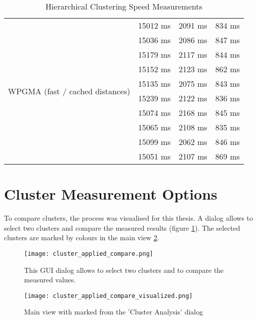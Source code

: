 \begin{table}[!ht]
\begin{tabular}{ | l | l | l | l | }
        \multirow{10}{*}{\begin{minipage}{3cm}WPGMA (fast / cached distances)\end{minipage}}
        & 15012 ms & 2091 ms & 834 ms \\
        & 15036 ms & 2086 ms & 847 ms \\
        & 15179 ms & 2117 ms & 844 ms \\
        & 15152 ms & 2123 ms & 862 ms \\
        & 15135 ms & 2075 ms & 843 ms \\
        & 15239 ms & 2122 ms & 836 ms \\
        & 15074 ms & 2168 ms & 845 ms \\
        & 15065 ms & 2108 ms & 835 ms \\
        & 15099 ms & 2062 ms & 846 ms \\
        & 15051 ms & 2107 ms & 869 ms \\
        \hline
    \end{tabular}
    \caption{Hierarchical Clustering Speed Measurements}
    \label{tab:speed_measurements_hierarchical_clustering}
\end{table}

\section{Cluster Measurement Options} \label{sec:cluster_measurement_options}
To compare clusters, the process was visualised for this thesis. A dialog allows to select two clusters and compare the measured results (figure \ref{fig:applied_clustering_analysis_GUI}). The selected clusters are marked by colours in the main view \ref{fig:applied_clustering_analysis_visualized_GUI}.

\begin{figure}[ht]
    \centering
    \texttt{[image: cluster\_applied\_compare.png]}
    \caption{This \gls{GUI} dialog allows to select two clusters and to compare the measured values.}
    \label{fig:applied_clustering_analysis_GUI}
\end{figure}

\begin{figure}[ht]
    \centering
    \begin{mdframed}[style=border]
        \texttt{[image: cluster\_applied\_compare\_visualized.png]}
    \end{mdframed}
    \caption{Main view with marked from the 'Cluster Analysis' dialog}
    \label{fig:applied_clustering_analysis_visualized_GUI}
\end{figure}


